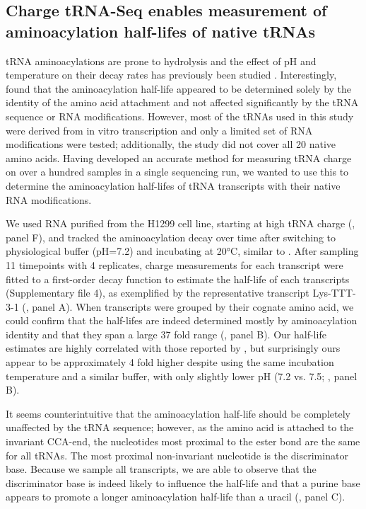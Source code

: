 \documentclass[9pt,lineno]{elife}
\begin{document}
\subsection{Charge tRNA-Seq enables measurement of aminoacylation half-lifes of native tRNAs}
tRNA aminoacylations are prone to hydrolysis and the effect of pH and temperature on their decay rates has previously been studied \citep{Hentzen1972-yd}.
Interestingly, \cite{Peacock2014-wk} found that the aminoacylation half-life appeared to be determined solely by the identity of the amino acid attachment and not affected significantly by the tRNA sequence or RNA modifications.
However, most of the tRNAs used in this study were derived from in vitro transcription and only a limited set of RNA modifications were tested; additionally, the study did not cover all 20 native amino acids.
Having developed an accurate method for measuring tRNA charge on over a hundred samples in a single sequencing run, we wanted to use this to determine the aminoacylation half-lifes of tRNA transcripts with their native RNA modifications.

We used RNA purified from the H1299 cell line, starting at high tRNA charge (, panel F), and tracked the aminoacylation decay over time after switching to physiological buffer (pH=7.2) and incubating at 20°C, similar to \cite{Peacock2014-wk}.
After sampling 11 timepoints with 4 replicates, charge measurements for each transcript were fitted to a first-order decay function to estimate the half-life of each transcripts (Supplementary file 4), as exemplified by the representative transcript Lys-TTT-3-1 (, panel A).
When transcripts were grouped by their cognate amino acid, we could confirm that the half-lifes are indeed determined mostly by aminoacylation identity and that they span a large 37 fold range (, panel B).
Our half-life estimates are highly correlated with those reported by \cite{Peacock2014-wk}, but surprisingly ours appear to be approximately 4 fold higher despite using the same incubation temperature and a similar buffer, with only slightly lower pH (7.2 vs. 7.5; , panel B).

It seems counterintuitive that the aminoacylation half-life should be completely unaffected by the tRNA sequence; however, as the amino acid is attached to the invariant CCA-end, the nucleotides most proximal to the ester bond are the same for all tRNAs.
The most proximal non-invariant nucleotide is the discriminator base.
Because we sample all transcripts, we are able to observe that the discriminator base is indeed likely to influence the half-life and that a purine base appears to promote a longer aminoacylation half-life than a uracil (, panel C).
\end{document}
